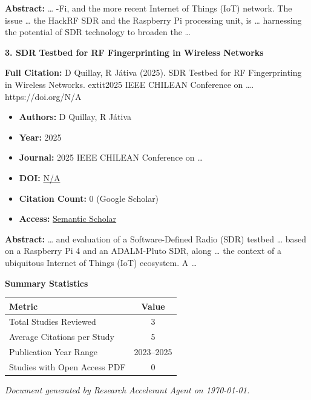 \documentclass[11pt,a4paper]{article}
\begin{document}
\textbf{Abstract:} … -Fi, and the more recent Internet of Things (IoT) network. The issue … the HackRF SDR and the Raspberry Pi processing unit, is … harnessing the potential of SDR technology to broaden the …\par\vspace{0.5em}



\textbf{3. SDR Testbed for RF Fingerprinting in Wireless Networks}

\textbf{Full Citation:} D Quillay, R Játiva (2025). SDR Testbed for RF Fingerprinting in Wireless Networks. 	extit{2025 IEEE CHILEAN Conference on …}. https://doi.org/N/A

\begin{resultbox}
\begin{itemize}[leftmargin=*]
    \item \textbf{Authors:} D Quillay, R Játiva
    \item \textbf{Year:} 2025
    \item \textbf{Journal:} 2025 IEEE CHILEAN Conference on …
    
    
    
    \item \textbf{DOI:} \href{https://doi.org/}{N/A}
    \item \textbf{Citation Count:} 0 (Google Scholar)
    \item \textbf{Access:} \href{https://ieeexplore.ieee.org/abstract/document/11476019/}{Semantic Scholar}
\end{itemize}
\end{resultbox}

\textbf{Abstract:} … and evaluation of a Software-Defined Radio (SDR) testbed … based on a Raspberry Pi 4 and an ADALM-Pluto SDR, along … the context of a ubiquitous Internet of Things (IoT) ecosystem. A …\par\vspace{0.5em}



\vspace{1em}
\textbf{\large Summary Statistics}\par\vspace{0.5em}

\begin{center}
\begin{tabular}{lc}
\toprule
\textbf{Metric} & \textbf{Value} \\
\midrule
Total Studies Reviewed & 3 \\
Average Citations per Study & 5 \\
Publication Year Range & 2023--2025 \\
Studies with Open Access PDF & 0 \\
\bottomrule
\end{tabular}
\end{center}


\vfill
\begin{center}
\textit{Document generated by Research Accelerant Agent on \today.}
\end{center}
\end{document}
